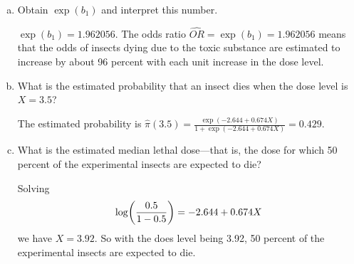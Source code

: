 \documentclass[10pt]{report}
\DeclarePairedDelimiter\autoparen{(}{)}
\newcommand{\pa}[1]{\autoparen*{#1}}
\begin{document}
\begin{enumerate}[a.]
	\item 
	Obtain $\exp(b_1)$ and interpret this number.
	
	$\exp(b_1) = 1.962056$. The odds ratio $\widehat{OR} = \exp(b_1) = 1.962056$ means that the odds of insects dying due to the toxic substance are estimated to increase by about 96 percent with each unit increase in the dose level.
	
	\item 
	What is the estimated probability that an insect dies when the dose level is $X=3.5$?
	
	The estimated probability is $\hat{\pi}(3.5) = \frac{\exp(-2.644 + 0.674X)}{1 + \exp(-2.644 + 0.674X)} = 0.429$.
	
	\item 
	What is the estimated median lethal dose---that is, the dose for which 50 percent of the experimental insects are expected to die?
	
	Solving
	\[
	\log\pa{\frac{0.5}{1-0.5}} = -2.644 + 0.674X
	\]
	we have $X=3.92$. So with the does level being 3.92, 50 percent of the experimental insects are expected to die.
\end{enumerate}
\end{document}
